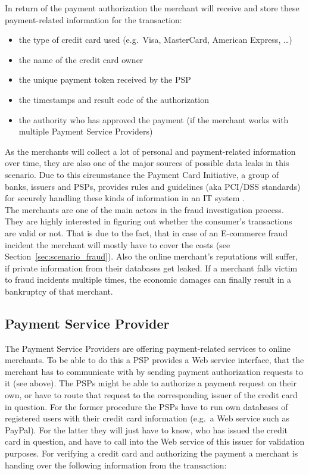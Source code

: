 In return of the payment authorization the merchant will receive and store these  payment-related information for the transaction:\@

\begin{itemize}
		\item the type of credit card used (e.g.\ Visa, MasterCard, American Express, \ldots)
		\item the name of the credit card owner
		\item the unique payment token received by the \gls{PSP}
		\item the timestamps and result code of the authorization
		\item the authority who has approved the payment (if the merchant works with multiple Payment Service Providers)
\end{itemize}

As the merchants will collect a lot of personal and payment-related information over time, they are also one of the major sources of possible data leaks in this scenario. Due to this circumstance the Payment Card Initiative, a group of banks, issuers and \gls{PSP}s, provides rules and guidelines (aka \gls{PCI/DSS} standards) for securely handling these kinds of information in an \gls{IT} system \citep{virtue2009payment}. \\

The merchants are one of the main actors in the fraud investigation process. They are highly interested in figuring out whether the consumer's transactions are valid or not. That is due to the fact, that in case of an \gls{E-commerce} fraud incident the merchant will mostly have to cover the costs (see Section~\ref{sec:scenario_fraud}). Also the online merchant's reputations will suffer, if private information from their databases get leaked. If a merchant falls victim to fraud incidents multiple times, the economic damages can finally result in a bankruptcy of that merchant.


\subsection{Payment Service Provider}
\label{subsec:stakeholder_psp}

The Payment Service Providers are offering payment-related services to online merchants. To be able to do this a \gls{PSP} provides a Web service interface, that the merchant has to communicate with by sending payment authorization requests to it (see above). The \gls{PSP}s might be able to authorize a payment request on their own, or have to route that request to the corresponding issuer of the credit card in question. For the former procedure the \gls{PSP}s have to run own databases of registered users with their credit card information (e.g.\ a Web service such as PayPal). For the latter they will just have to know, who has issued the credit card in question, and have to call into the Web service of this issuer for validation purposes. For verifying a credit card and authorizing the payment a merchant is handing over the following information from the transaction:\@

